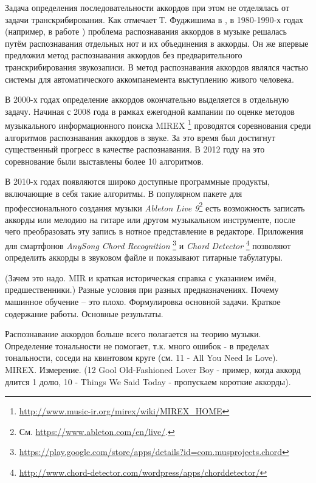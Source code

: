 Задача определения последовательности аккордов при этом не отделялась от задачи
транскрибирования. Как отмечает Т. Фуджишима в \cite{Fujishima1999},
в 1980-1990-х годах (например, в работе \cite{Aono1998}) проблема распознавания
аккордов в музыке решалась путём распознавания отдельных нот и их объединения в
аккорды. Он же впервые предложил метод распознавания аккордов без
предварительного транскрибирования звукозаписи. В \cite{Aono1998} метод
распознавания аккордов являлся частью системы для автоматического
аккомпанемента выступлению живого человека.

В 2000-х годах определение аккордов окончательно выделяется в отдельную задачу.
Начиная с 2008 года в рамках ежегодной кампании по оценке методов музыкального
информационного поиска MIREX
\footnote{\url{http://www.music-ir.org/mirex/wiki/MIREX_HOME}} проводятся
соревнования среди алгоритмов распознавания аккордов в звуке. За это время был
достигнут существенный прогресс в качестве распознавания. В 2012 году на это
соревнование были выставлены более 10 алгоритмов.

В 2010-х годах появляются широко доступные программные продукты, включающие в
себя такие алгоритмы. В популярном пакете для профессионального создания музыки
\emph{Ableton Live 9}\footnote{См. \url{https://www.ableton.com/en/live/}.}
есть возможность записать аккорды или мелодию на гитаре или другом музыкальном
инструменте, после чего преобразовать эту запись в нотное представление в
редакторе. Приложения для смартфонов \emph{AnySong Chord Recognition} \footnote{
\url{https://play.google.com/store/apps/details?id=com.musprojects.chord}} и
\emph{Chord Detector} \footnote{
\url{http://www.chord-detector.com/wordpress/apps/chorddetector/}} позволяют
определить аккорды в звуковом файле и показывают гитарные табулатуры.




(Зачем это надо. MIR и краткая историческая справка с указанием имён,
предшественники.) Разные условия при разных предназначениях. Почему машинное
обучение -- это плохо. Формулировка основной задачи. Краткое содержание работы.
Основные результаты.



Распознавание аккордов больше всего полагается на теорию музыки. Определение
тональности не помогает, т.к. много ошибок - в пределах тональности, соседи на
квинтовом круге (см. 11 - All You Need Is Love). MIREX.
Измерение. (12 Gool Old-Fashioned Lover Boy - пример, когда аккорд длится 1
долю, 10 - Things We Said Today - пропускаем короткие аккорды).

